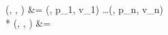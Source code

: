 \matchOp{\Sigma}(\rho, , ) &{}= \matchOp{\Sigma}(\rho, p_1, v_1) \override \ldots \override \matchOp{\Sigma}(\rho, p_n, v_n) \\*
\matchOp{\Sigma}(\rho, , ) &{}= \errExcluded